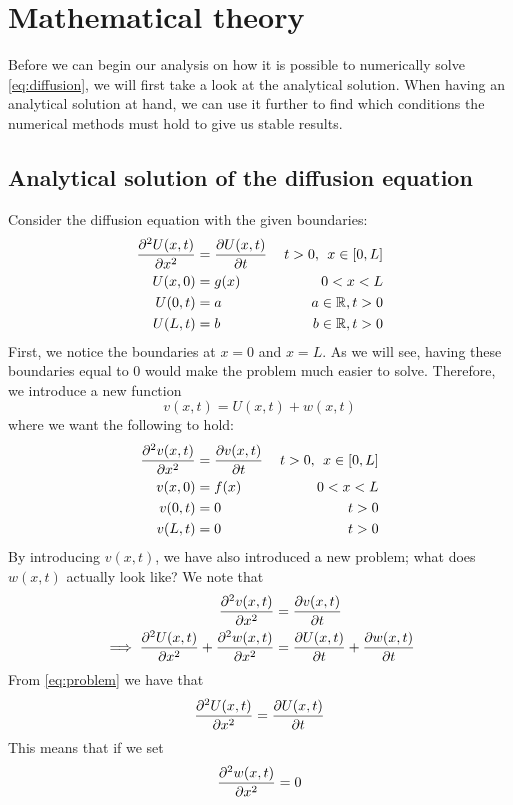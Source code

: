\documentclass[12pt,english,a4paper]{article}
\begin{document}
\section{Mathematical theory}
Before we can begin our analysis on how it is possible to numerically solve \vref{eq:diffusion}, we will first take a look at the analytical solution. When having an analytical solution at hand, we can use it further to find which conditions the numerical methods must hold to give us stable results.
\subsection{Analytical solution of the diffusion equation}
Consider the diffusion equation with the given boundaries:
\begin{equation}\label{eq:problem}
\begin{aligned}
\pdv[2]{U(x,t)}{x} &= \pdv{U(x,t)}{t} &\: t>0, \:\:x\in[0,L] \\
U(x,0) &= g(x)  &0 < x < L\\
U(0,t) &=  a & a \in \mathbb{R},  t>0 \\
U(L,t) &= b &b \in \mathbb{R}, t>0
\end{aligned}
\end{equation}
First, we notice the boundaries at \(x = 0\) and \(x = L\). As we will see, having these boundaries equal to 0 would make the problem much easier to solve. Therefore, we introduce a new function
\[
v(x,t) = U(x,t) + w(x,t)
\]
where we want the following to hold:
\begin{equation}\label{eq:dummy}
\begin{aligned}
\pdv[2]{v(x,t)}{x} &= \pdv{v(x,t)}{t} &\: t>0, \:\:x\in[0,L] \\
v(x,0) &= f(x)  &0 < x < L\\
v(0,t) &=  0 &  t>0 \\
v(L,t) &= 0 & t>0
\end{aligned}
\end{equation}
By introducing \(v(x,t)\), we have also introduced a new problem; what does \(w(x,t)\) actually look like? We note that
\begin{alignat*}{2}
\pdv[2]{v(x,t)}{x} &= \pdv{v(x,t)}{t}  \\
\implies \pdv[2]{U(x,t)}{x} + \pdv[2]{w(x,t)}{x} &= \pdv{U(x,t)}{t} + \pdv{w(x,t)}{t}
\end{alignat*}
From \ref{eq:problem} we have that
\[
\pdv[2]{U(x,t)}{x} = \pdv{U(x,t)}{t}
\]
This means that if we set
\begin{equation} \label{eq:dummy1}
 \pdv[2]{w(x,t)}{x}  = 0
\end{equation}
\end{document}
